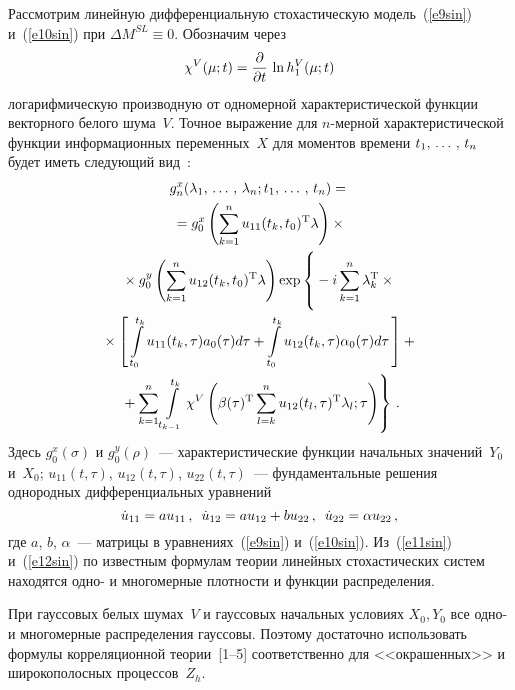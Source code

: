 \begin{multicols}{2}
Рассмотрим линейную дифференциальную стохастическую модель~(\ref{e9sin}) и~(\ref{e10sin}) при $\Delta M^{SL} \equiv 0$.
Обозначим через  
$$
\chi^V (\mu;t) =\displaystyle\frac{\displaystyle \partial\mathstrut}{\displaystyle \partial t\mathstrut}\, \ln h_1^V (\mu;t)
$$
логарифмическую производную от одномерной харак\-теристической функции
векторного белого шума~$V$. Точное выражение для $n$-мерной характеристической функции
информационных переменных~$X$ для моментов времени $t_1,\,\ldots\,,\, t_n$  будет иметь следующий вид~\cite{7sin, 8sin}:
\begin{multline}
g_n^x (\lambda_1\tr \lambda_n; t_1\tr t_n) ={}\\
{}= g_0^x \left( \sss_{k=1}^n u_{11}(t_k, t_0)^{\mathrm{T}}\lambda\right)\times{}\\
{}\times  g_0^y  \left(  
\sss_{k=1}^n u_{12}(t_k, t_0)^{\mathrm{T}}\lambda\right)\exp\left \{
\vphantom{\iii_{t_{k-1}}^{t_k}}
 -i \sss_{k=1}^n \lambda_k^{\mathrm{T}} \times{}\right.\\
{}\times \lk \iii_{t_0}^{t_k} u_{11} (t_k,\tau) a_0 (\tau) d\tau + \iii_{t_0}^{t_k} u_{12} (t_k,\tau) \alpha_0 (\tau) d\tau\rk+{}\\
\left.{}+ \sss_{k=1}^n \iii_{t_{k-1}}^{t_k} \chi^V \left( \beta(\tau)^{\mathrm{T}} \sss_{l=k}^n u_{12} (t_l,\tau)^{\mathrm{T}} \lambda_l;\tau\right)
\right \}\,.
\label{e11sin}
\end{multline}
Здесь $g_0^x (\sigma)$ и $g_0^y(\rho)$~--- характеристические функции начальных значений~$Y_0$ и~$X_0$;
$u_{11}(t,\tau)$, $u_{12}(t,\tau)$, $u_{22}(t,\tau)$~--- фундаментальные решения однородных дифференциальных
уравнений
\begin{equation}
\dot u_{11} = a u_{11}\,,\enskip\dot u_{12} = a u_{12}+b u_{22}\,,\enskip\dot u_{22} = \alpha u_{22}\,,
\label{e12sin}
\end{equation}
где $a$, $b$, $\alpha$~--- матрицы в уравнениях~(\ref{e9sin}) и~(\ref{e10sin}).
Из~(\ref{e11sin}) и~(\ref{e12sin}) по известным формулам теории линейных стохастических систем~\cite{7sin, 8sin} 
находятся одно- и многомерные плотности и функции распределения.

При гауссовых белых шумах~$V$ и гауссовых начальных условиях $X_0, Y_0$
все одно- и многомерные распределения гауссовы. Поэтому достаточно использовать формулы корреляционной теории~[1--5]
соответственно для <<окрашенных>> и широкополосных процессов~$Z_h$.


\end{multicols}
